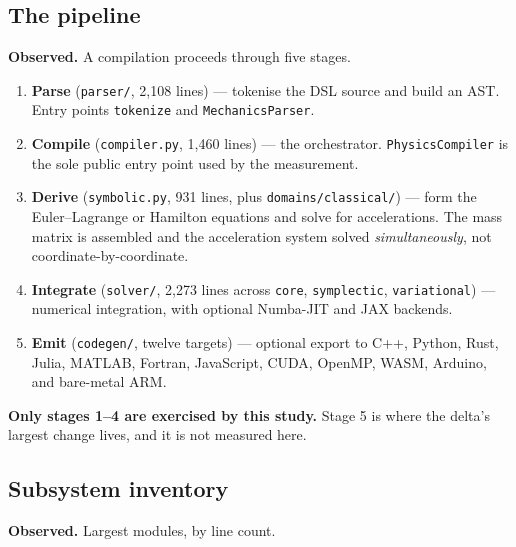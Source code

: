 \documentclass[11pt,a4paper]{article}
\begin{document}
\subsection{The pipeline}

\noindent\textbf{Observed.} A compilation proceeds through five stages.

\begin{enumerate}[leftmargin=1.6em,itemsep=0.35em]
  \item \textbf{Parse} (\texttt{parser/}, 2{,}108 lines) --- tokenise the DSL
        source and build an AST. Entry points \texttt{tokenize} and
        \texttt{MechanicsParser}.
  \item \textbf{Compile} (\texttt{compiler.py}, 1{,}460 lines) --- the
        orchestrator. \texttt{PhysicsCompiler} is the sole public entry point
        used by the measurement.
  \item \textbf{Derive} (\texttt{symbolic.py}, 931 lines, plus
        \texttt{domains/classical/}) --- form the Euler--Lagrange or Hamilton
        equations and solve for accelerations. The mass matrix is assembled and
        the acceleration system solved \emph{simultaneously}, not
        coordinate-by-coordinate.
  \item \textbf{Integrate} (\texttt{solver/}, 2{,}273 lines across
        \texttt{core}, \texttt{symplectic}, \texttt{variational}) ---
        numerical integration, with optional Numba-JIT and JAX backends.
  \item \textbf{Emit} (\texttt{codegen/}, twelve targets) --- optional export
        to C++, Python, Rust, Julia, MATLAB, Fortran, JavaScript, CUDA,
        OpenMP, WASM, Arduino, and bare-metal ARM.
\end{enumerate}

\noindent\textbf{Only stages 1--4 are exercised by this study.} Stage 5 is
where the delta's largest change lives, and it is not measured here.

\subsection{Subsystem inventory}

\noindent\textbf{Observed.} Largest modules, by line count.
\end{document}
